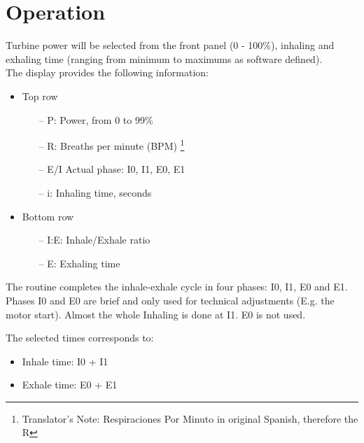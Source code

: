 \section{Operation}
    Turbine power will be selected from the front panel (0 - 100\%), inhaling and exhaling time (ranging from minimum to maximums as software defined).\\
    
    The display provides the following information:
    \begin{itemize}
        \item Top row
        \begin{itemize}
            \item[--] P: Power, from 0 to 99\%
            \item[--] R: Breaths per minute (BPM) \footnote{Translator's Note: Respiraciones Por Minuto in original Spanish, therefore the R}
            \item[--] E/I Actual phase: I0, I1, E0, E1
            \item[--] i: Inhaling time, seconds
        \end{itemize}
        \item Bottom row
        \begin{itemize}
            \item[--] I:E: Inhale/Exhale ratio
            \item[--] E: Exhaling time
        \end{itemize}
    \end{itemize}
    
    The routine completes the inhale-exhale cycle in four phases: I0, I1, E0 and E1. Phases I0 and E0 are brief and only used for technical adjustments (E.g. the motor start). Almost the whole Inhaling is done at I1. E0 is not used.
    
    The selected times corresponds to:
    \begin{itemize}
        \item Inhale time: I0 + I1
        \item Exhale time: E0 + E1
    \end{itemize}
    
